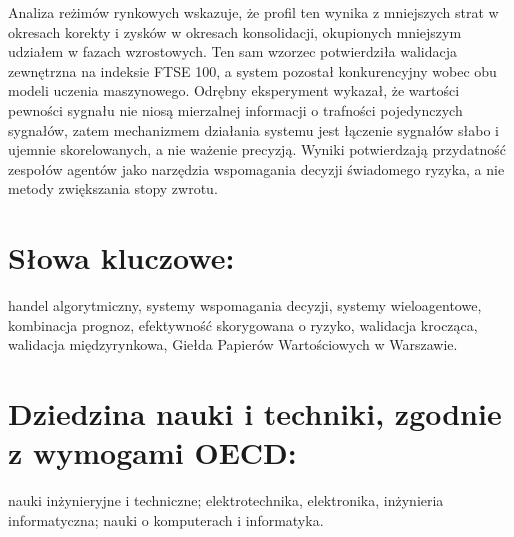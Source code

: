 \begin{polish}
Analiza reżimów rynkowych wskazuje, że profil ten wynika z mniejszych strat w okresach korekty i zysków w okresach konsolidacji, okupionych mniejszym udziałem w fazach wzrostowych. Ten sam wzorzec potwierdziła walidacja zewnętrzna na indeksie FTSE 100, a system pozostał konkurencyjny wobec obu modeli uczenia maszynowego. Odrębny eksperyment wykazał, że wartości pewności sygnału nie niosą mierzalnej informacji o trafności pojedynczych sygnałów, zatem mechanizmem działania systemu jest łączenie sygnałów słabo i ujemnie skorelowanych, a nie ważenie precyzją. Wyniki potwierdzają przydatność zespołów agentów jako narzędzia wspomagania decyzji świadomego ryzyka, a nie metody zwiększania stopy zwrotu.

\section*{Słowa kluczowe:}
\noindent handel algorytmiczny, systemy wspomagania decyzji, systemy wieloagentowe, kombinacja prognoz, efektywność skorygowana o ryzyko, walidacja krocząca, walidacja międzyrynkowa, Giełda Papierów Wartościowych w Warszawie.

\section*{Dziedzina nauki i techniki, zgodnie z wymogami OECD:}
\noindent nauki inżynieryjne i techniczne; elektrotechnika, elektronika, inżynieria informatyczna; nauki o komputerach i informatyka.
\end{polish}
